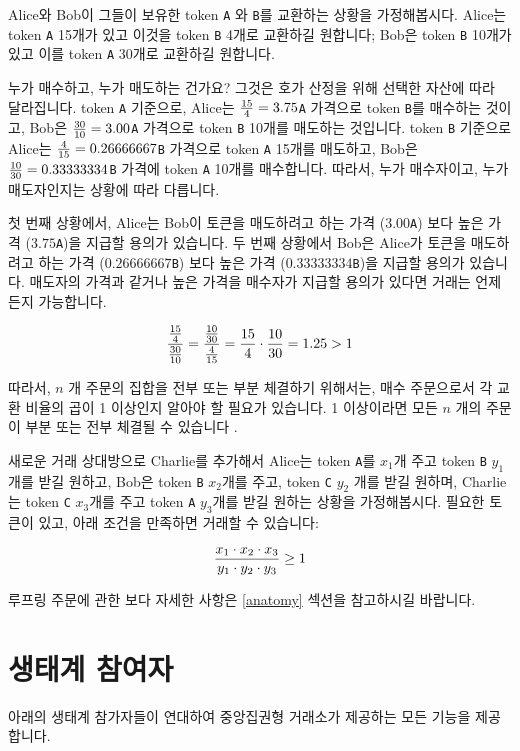 \documentclass[UTF8,nofonts]{article}
\begin{document}
\begin{multicols}{2}
Alice와 Bob이 그들이 보유한 token \verb|A| 와 \verb|B|를 교환하는 상황을 가정해봅시다. Alice는 token \verb|A| 15개가 있고 이것을 token \verb|B| 4개로 교환하길 원합니다; Bob은 token \verb|B| 10개가 있고 이를 token \verb|A| 30개로 교환하길 원합니다.

누가 매수하고, 누가 매도하는 건가요? 그것은 호가 산정을 위해 선택한 자산에 따라 달라집니다. token \verb|A| 기준으로, Alice는 ${15 \over 4} = 3.75$\verb|A| 가격으로 token \verb|B|를 매수하는 것이고, Bob은 ${30 \over 10} = 3.00$\verb|A| 가격으로 token \verb|B| 10개를 매도하는 것입니다. token \verb|B| 기준으로 Alice는 ${4\over 15}=0.26666667$\verb|B| 가격으로 token \verb|A| 15개를 매도하고, Bob은 ${10 \over 30}=0.33333334$\verb|B| 가격에 token \verb|A| 10개를 매수합니다. 따라서, 누가 매수자이고, 누가 매도자인지는 상황에 따라 다릅니다.      

첫 번째 상황에서, Alice는 Bob이 토큰을 매도하려고 하는 가격 ($3.00$\verb|A|) 보다 높은 가격 ($3.75$\verb|A|)을 지급할 용의가 있습니다. 두 번째 상황에서 Bob은 Alice가 토큰을 매도하려고 하는 가격 ($0.26666667$\verb|B|) 보다 높은 가격 ($0.33333334$\verb|B|)을 지급할 용의가 있습니다. 매도자의 가격과 같거나 높은 가격을 매수자가 지급할 용의가 있다면 거래는 언제든지 가능합니다. 

\begin{equation}
{{15\over 4} \over {30\over 10}} = {{10\over 30} \over {4\over 15}}={15 \over 4} \cdot {10 \over 30} = 1.25 > 1
\end{equation}

따라서, $n$ 개 주문의 집합을 전부 또는 부분 체결하기 위해서는, 매수 주문으로서 각 교환 비율의 곱이 1 이상인지 알아야 할 필요가 있습니다. 1 이상이라면 모든 $n$ 개의 주문이 부분 또는 전부 체결될 수 있습니다 \cite{supersymmetry}.   

새로운 거래 상대방으로 Charlie를 추가해서 Alice는 token \verb|A|를 $x_1$개 주고 token \verb|B| $y_1$개를 받길 원하고, Bob은 token \verb|B| $x_2$개를 주고, token \verb|C| $y_2$ 개를 받길 원하며, Charlie는 token \verb|C| $x_3$개를 주고 token \verb|A| $y_3$개를 받길 원하는 상황을 가정해봅시다. 필요한 토큰이 있고, 아래 조건을 만족하면 거래할 수 있습니다:

\begin{equation}
{{x_1 \cdot x_2 \cdot x_3 \over y_1 \cdot y_2 \cdot y_3} \geq 1}
\end{equation}

루프링 주문에 관한 보다 자세한 사항은 \ref{anatomy} 섹션을 참고하시길 바랍니다.

\section{생태계 참여자\label{sec:ecosystem}}
아래의 생태계 참가자들이 연대하여 중앙집권형 거래소가 제공하는 모든 기능을 제공합니다.


\end{multicols}
\end{document}
